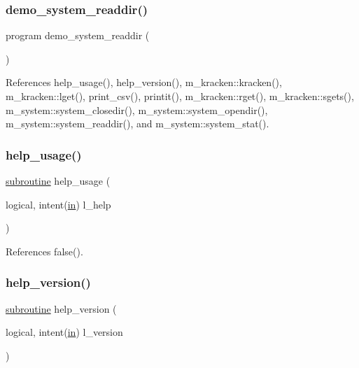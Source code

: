 \subsubsection{\texorpdfstring{demo\+\_\+system\+\_\+readdir()}{demo\_system\_readdir()}}
{\footnotesize\ttfamily program demo\+\_\+system\+\_\+readdir (\begin{DoxyParamCaption}{ }\end{DoxyParamCaption})}



References help\+\_\+usage(), help\+\_\+version(), m\+\_\+kracken\+::kracken(), m\+\_\+kracken\+::lget(), print\+\_\+csv(), printit(), m\+\_\+kracken\+::rget(), m\+\_\+kracken\+::sgets(), m\+\_\+system\+::system\+\_\+closedir(), m\+\_\+system\+::system\+\_\+opendir(), m\+\_\+system\+::system\+\_\+readdir(), and m\+\_\+system\+::system\+\_\+stat().

\mbox{\label{__ls_8f90_a3e09a3b52ee8fb04eeb93fe5761626a8}} 
\subsubsection{\texorpdfstring{help\+\_\+usage()}{help\_usage()}}
{\footnotesize\ttfamily \hyperlink{M__stopwatch_83_8txt_acfbcff50169d691ff02d4a123ed70482}{subroutine} help\+\_\+usage (\begin{DoxyParamCaption}\item[{logical, intent(\hyperlink{M__journal_83_8txt_afce72651d1eed785a2132bee863b2f38}{in})}]{l\+\_\+help }\end{DoxyParamCaption})}



References false().

\mbox{\label{__ls_8f90_a39c21619b08a3c22f19e2306efd7f766}} 
\subsubsection{\texorpdfstring{help\+\_\+version()}{help\_version()}}
{\footnotesize\ttfamily \hyperlink{M__stopwatch_83_8txt_acfbcff50169d691ff02d4a123ed70482}{subroutine} help\+\_\+version (\begin{DoxyParamCaption}\item[{logical, intent(\hyperlink{M__journal_83_8txt_afce72651d1eed785a2132bee863b2f38}{in})}]{l\+\_\+version }\end{DoxyParamCaption})}



